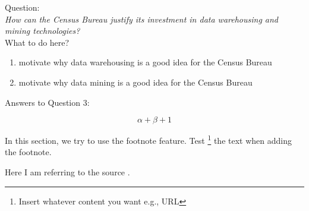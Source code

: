 Question:\\
\emph{
    How can the Census Bureau justify its investment in data warehousing and mining
technologies?
}\\

What to do here?
\begin{enumerate}
    \item motivate why data warehousing is a good idea for the Census Bureau
    \item motivate why data mining is a good idea for the Census Bureau
  \end{enumerate}

Answers to Question 3:

\begin{equation}
\alpha + \beta + 1
\end{equation}

In this section, we try to use the footnote feature. 
Test \footnote{Insert whatever content you want e.g., URL} the text when adding the footnote.

Here I am referring to the source \cite{DataScience}.